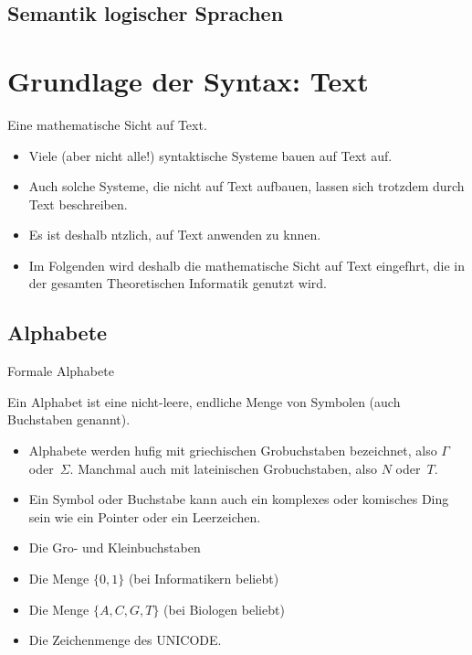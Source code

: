 \subsection[Semantik\protect\\ logischer Sprachen]{Semantik logischer Sprachen}




\section{Grundlage der Syntax: Text}

\begin{frame}{Eine mathematische Sicht auf Text.}
  \begin{itemize}
  \item Viele (aber nicht alle!) syntaktische Systeme bauen auf
    \alert{Text} auf.
  \item Auch solche Systeme, die nicht auf Text aufbauen, lassen sich
    trotzdem durch Text beschreiben. 
  \item Es ist deshalb ntzlich, auf Text  anwenden zu knnen.
  \item Im Folgenden wird deshalb die \alert{mathematische Sicht} auf
    Text eingefhrt, die \alert{in der gesamten Theoretischen
      Informatik} genutzt wird.
  \end{itemize}  
\end{frame}


\subsection{Alphabete}

\begin{frame}{Formale Alphabete}
  \begin{definition}[Alphabet]
    Ein \alert{Alphabet} ist eine nicht-leere, endliche Menge von
    \alert{Symbolen} (auch \alert{Buchstaben} genannt). 
  \end{definition}
  
  \begin{itemize}
  \item Alphabete werden hufig mit griechischen Grobuchstaben
    bezeichnet, also $\Gamma$ oder~$\Sigma$. Manchmal auch mit
    lateinischen Grobuchstaben, also $N$ oder~$T$.
  \item Ein Symbol oder Buchstabe kann auch ein komplexes oder
    komisches Ding sein wie ein Pointer oder ein Leerzeichen.
  \end{itemize}

  \begin{examples}
    \begin{itemize}
    \item Die Gro- und Kleinbuchstaben
    \item Die Menge $\{0,1\}$ (bei Informatikern beliebt)
    \item Die Menge $\{A,C,G,T\}$ (bei Biologen beliebt)
    \item Die Zeichenmenge des UNICODE.
    \end{itemize}
  \end{examples}
\end{frame}


